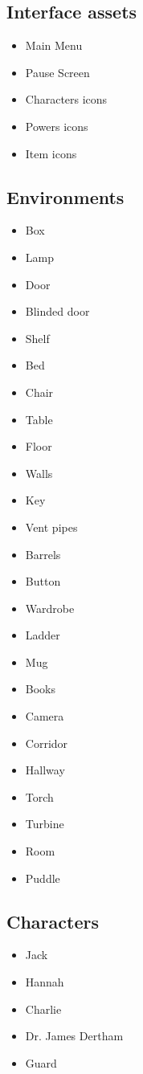 \subsection{Interface assets}
\begin{itemize}  
\item Main Menu
\item Pause Screen
\item Characters icons
\item Powers icons
\item Item icons
\end{itemize}


\subsection{Environments}
\begin{itemize}  
\item Box
\item Lamp
\item Door
\item Blinded door
\item Shelf
\item Bed
\item Chair
\item Table
\item Floor
\item Walls
\item Key
\item Vent pipes
\item Barrels
\item Button
\item Wardrobe
\item Ladder
\item Mug
\item Books
\item Camera
\item Corridor
\item Hallway
\item Torch
\item Turbine
\item Room
\item Puddle
\end{itemize}
        
\subsection{Characters}
\begin{itemize}  
\item Jack
\item Hannah
\item Charlie
\item Dr. James Dertham
\item Guard
\end{itemize}


